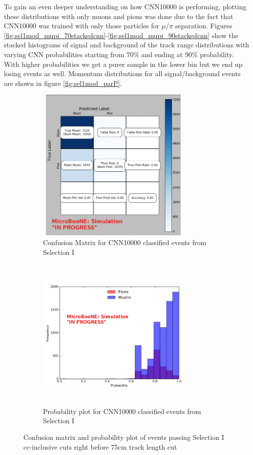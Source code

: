 To gain an even deeper understanding on how CNN10000 is performing, plotting these distributions with only muons and pions was done due to the fact that CNN10000 was trained with only those particles for $\mu/\pi$ separation. Figures \ref{fig:sel1mod_mupi_70stackedcnn}-\ref{fig:sel1mod_mupi_90stackedcnn} show the stacked histograms of signal and background of the track range distributions with varying CNN probabilities starting from 70\% and ending at 90\% probability. With higher probabilities we get a purer sample in the lower bin but we end up losing events as well. Momentum distributions for all signal/background events are shown in figure \ref{fig:sel1mod_parP}.    

\begin{figure}[htp!]
\centering
	\begin{subfigure}[b]{.45\textwidth}
	\includegraphics[width=3in,height=3in]{figs/sel1mod_confusion_wrongnorm.png}
	\caption{Confusion Matrix for CNN10000 classified events from Selection I}
	\label{fig:confusion_sel1mod}
	\end{subfigure}
	\quad
	\begin{subfigure}[b]{.45\textwidth}
	\includegraphics[width=3in,height=3in]{figs/probplot_wrongnorm_selImod.png}
	\caption{Probability plot for CNN10000 classified events from Selection I}  
	\label{fig:prob_sel1mod}
	\end{subfigure}
	\quad
\caption{Confusion matrix and probability plot of events passing Selection I cc-inclusive cuts right before 75cm track length cut}
\label{probplots}
\end{figure}

